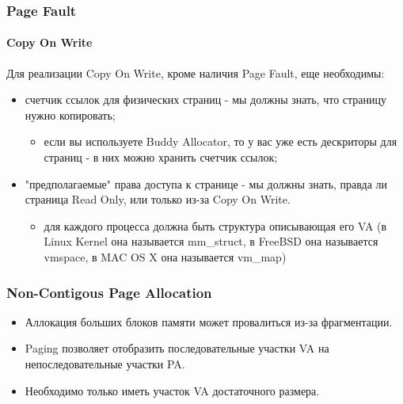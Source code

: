 \begin{frame}
\frametitle{Page Fault}
\framesubtitle{Copy On Write}

Для реализации Copy On Write, кроме наличия Page Fault, еще необходимы:
\begin{itemize}
  \item счетчик ссылок для физических страниц - мы должны знать, что страницу нужно копировать;
    \begin{itemize}
      \item если вы используете Buddy Allocator, то у вас уже есть дескриторы для страниц - в них можно хранить счетчик ссылок;
    \end{itemize}
  \item "предполагаемые" права доступа к странице - мы должны знать, правда ли страница Read Only, или только из-за Copy On Write.
    \begin{itemize}
      \item для каждого процесса должна быть структура описывающая его VA (в Linux Kernel она называется mm\_struct, в FreeBSD она называется vmspace, в MAC OS X она называется vm\_map)
    \end{itemize}
\end{itemize}
\end{frame}

\begin{frame}
\frametitle{Non-Contigous Page Allocation}

\begin{itemize}
  \item<1-> Аллокация больших блоков памяти может провалиться из-за фрагментации.
  \item<2-> Paging позволяет отобразить последовательные участки VA на непоследовательные участки PA.
  \item<3-> Необходимо только иметь участок VA достаточного размера.
\end{itemize}
\end{frame}

